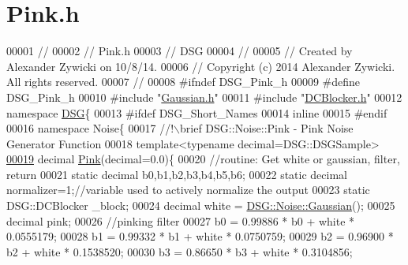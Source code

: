 \hypertarget{_pink_8h_source}{\section{Pink.\+h}
\label{_pink_8h_source}
}

\begin{DoxyCode}
00001 \textcolor{comment}{//}
00002 \textcolor{comment}{//  Pink.h}
00003 \textcolor{comment}{//  DSG}
00004 \textcolor{comment}{//}
00005 \textcolor{comment}{//  Created by Alexander Zywicki on 10/8/14.}
00006 \textcolor{comment}{//  Copyright (c) 2014 Alexander Zywicki. All rights reserved.}
00007 \textcolor{comment}{//}
00008 \textcolor{preprocessor}{#ifndef DSG\_Pink\_h}
00009 \textcolor{preprocessor}{#define DSG\_Pink\_h}
00010 \textcolor{preprocessor}{#include "\hyperlink{_gaussian_8h}{Gaussian.h}"}
00011 \textcolor{preprocessor}{#include "\hyperlink{_d_c_blocker_8h}{DCBlocker.h}"}
00012 \textcolor{keyword}{namespace }\hyperlink{namespace_d_s_g}{DSG}\{
00013 \textcolor{preprocessor}{#ifdef DSG\_Short\_Names}
00014     \textcolor{keyword}{inline}
00015 \textcolor{preprocessor}{#endif}
00016     \textcolor{keyword}{namespace }Noise\{\textcolor{comment}{}
00017 \textcolor{comment}{        //!\(\backslash\)brief DSG::Noise::Pink - Pink Noise Generator Function}
00018 \textcolor{comment}{}        \textcolor{keyword}{template}<\textcolor{keyword}{typename} decimal=DSG::DSGSample>
\hypertarget{_pink_8h_source_l00019}{}\hyperlink{namespace_d_s_g_1_1_noise_a9f0bab677a7602a8e0d40e040de8c8b2}{00019}         decimal \hyperlink{namespace_d_s_g_1_1_noise_a9f0bab677a7602a8e0d40e040de8c8b2}{Pink}(decimal=0.0)\{
00020             \textcolor{comment}{//routine: Get white or gaussian, filter, return}
00021             \textcolor{keyword}{static} decimal b0,b1,b2,b3,b4,b5,b6;
00022             \textcolor{keyword}{static} decimal normalizer=1;\textcolor{comment}{//variable used to actively normalize the output}
00023             \textcolor{keyword}{static} DSG::DCBlocker \_block;
00024             decimal white = \hyperlink{namespace_d_s_g_1_1_noise_a87c4bcd92a902d32df1d7f1d5acffcd4}{DSG::Noise::Gaussian}();
00025             decimal pink;
00026             \textcolor{comment}{//pinking filter}
00027             b0 = 0.99886 * b0 + white * 0.0555179;
00028             b1 = 0.99332 * b1 + white * 0.0750759;
00029             b2 = 0.96900 * b2 + white * 0.1538520;
00030             b3 = 0.86650 * b3 + white * 0.3104856;

\end{DoxyCode}
